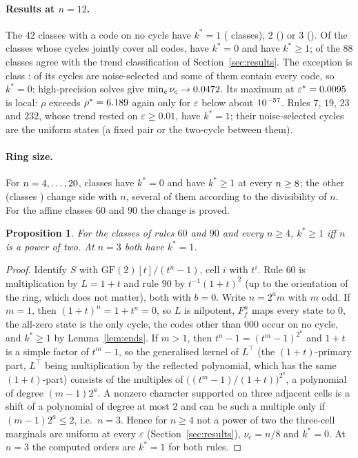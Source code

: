 \documentclass[11pt,a4paper]{article}
\newtheorem{proposition}{Proposition}
\theoremstyle{remark}
\newcommand{\eps}{\varepsilon}
\begin{document}
\paragraph{Results at $n=12$.} The $42$ classes with a code on no cycle have $k^*=1$ (\NumBkOne{} classes), $2$ (\NumBkTwo) or $3$ (\NumBkThree). Of the \NumUclasses{} classes whose cycles jointly cover all codes, \NumUrisingVtwo{} have $k^*=0$ and \NumUfallingVtwo{} have $k^*\ge1$; \NumAgreeVone{} of the $88$ classes agree with the trend classification of Section~\ref{sec:results}. The exception is class \FlipRules: \RuleOneOhSixStable{} of its \RuleOneOhSixCycles{} cycles are noise-selected and some of them contain every code, so $k^*=0$; high-precision solves give $\min_c\nu_c\to0.0472$. Its maximum at $\eps^*=\RuleOneOhSixEpsStar$ is local: $\rho$ exceeds $\rho^*=6.189$ again only for $\eps$ below about $10^{-57}$. Rules $7$, $19$, $23$ and $232$, whose trend rested on $\eps\ge0.01$, have $k^*=1$; their noise-selected cycles are the uniform states (a fixed pair or the two-cycle between them).

\paragraph{Ring size.} For $n=4,\dots,20$, \SweepAllZero{} classes have $k^*=0$ and \SweepAllFall{} have $k^*\ge1$ at every $n\ge8$; the other \SweepVaryCount{} (classes \SweepVaryRules) change side with $n$, several of them according to the divisibility of $n$. For the affine classes $60$ and $90$ the change is proved.

\begin{proposition}\label{prop:pow2}
For the classes of rules $60$ and $90$ and every $n\ge4$, $k^*\ge1$ iff $n$ is a power of two. At $n=3$ both have $k^*=1$.
\end{proposition}
\begin{proof}
Identify $S$ with $\mathrm{GF}(2)[t]/(t^n-1)$, cell $i$ with $t^i$. Rule $60$ is multiplication by $L=1+t$ and rule $90$ by $t^{-1}(1+t)^2$ (up to the orientation of the ring, which does not matter), both with $b=0$. Write $n=2^am$ with $m$ odd. If $m=1$, then $(1+t)^n=1+t^n=0$, so $L$ is nilpotent, $F_f^n$ maps every state to $0$, the all-zero state is the only cycle, the codes other than $000$ occur on no cycle, and $k^*\ge1$ by Lemma~\ref{lem:ends}. If $m>1$, then $t^n-1=(t^m-1)^{2^a}$ and $1+t$ is a simple factor of $t^m-1$, so the generalised kernel of $L^{\!\top}$ (the $(1+t)$-primary part, $L^{\!\top}$ being multiplication by the reflected polynomial, which has the same $(1+t)$-part) consists of the multiples of $\big((t^m-1)/(1+t)\big)^{2^a}$, a polynomial of degree $(m-1)2^a$. A nonzero character supported on three adjacent cells is a shift of a polynomial of degree at most $2$ and can be such a multiple only if $(m-1)2^a\le2$, i.e.\ $n=3$. Hence for $n\ge4$ not a power of two the three-cell marginals are uniform at every $\eps$ (Section~\ref{sec:results}), $\nu_c=n/8$ and $k^*=0$. At $n=3$ the computed orders are $k^*=1$ for both rules.
\end{proof}
\end{document}
